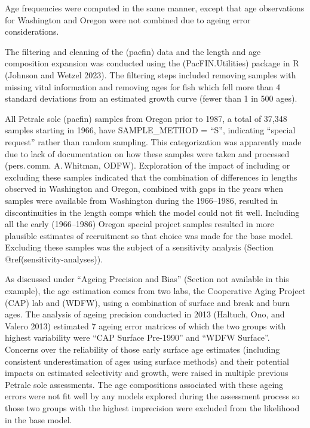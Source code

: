 \documentclass[
]{scrartcl}
\begin{document}
Age frequencies were computed in the same manner, except that age
observations for Washington and Oregon were not combined due to ageing
error considerations.

The filtering and cleaning of the (\textsf{pacfin}) data and the length and age
composition expansion was conducted using the (\textsf{PacFIN.Utilities}) package
in \textsf{R} (Johnson and Wetzel 2023). The filtering steps included removing
samples with missing vital information and removing ages for fish which
fell more than 4 standard deviations from an estimated growth curve
(fewer than 1 in 500 ages).

All Petrale sole (pacfin) samples from Oregon prior to 1987, a total of
37,348 samples starting in 1966, have \textsf{SAMPLE\_METHOD = ``S''}, indicating
``special request'' rather than random sampling. This categorization was
apparently made due to lack of documentation on how these samples were
taken and processed (pers.\,comm. A.\,Whitman, ODFW). Exploration of the
impact of including or excluding these samples indicated that the
combination of differences in lengths observed in Washington and Oregon,
combined with gaps in the years when samples were available from
Washington during the 1966--1986, resulted in discontinuities in the
length comps which the model could not fit well. Including all the early
(1966--1986) Oregon special project samples resulted in more plausible
estimates of recruitment so that choice was made for the base model.
Excluding these samples was the subject of a sensitivity analysis
(Section @ref(sensitivity-analyses)).

As discussed under ``Ageing Precision and Bias'' (Section not available
in this example), the age estimation comes from two labs, the
Cooperative Aging Project (CAP) lab and (WDFW), using a combination of
surface and break and burn ages. The analysis of ageing precision
conducted in 2013 (Haltuch, Ono, and Valero 2013) estimated 7 ageing
error matrices of which the two groups with highest variability were
``CAP Surface Pre-1990'' and ``WDFW Surface''. Concerns over the
reliability of those early surface age estimates (including consistent
underestimation of ages using surface methods) and their potential
impacts on estimated selectivity and growth, were raised in multiple
previous Petrale sole assessments. The age compositions associated with
these ageing errors were not fit well by any models explored during the
assessment process so those two groups with the highest imprecision were
excluded from the likelihood in the base model.
\end{document}

